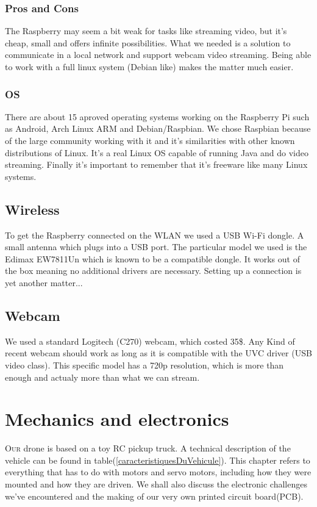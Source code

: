 \documentclass[a4paper,11pt]{report}
\begin{document}
{\begin{enumerate}
\subsection{Pros and Cons}
The Raspberry may seem a bit weak for tasks like streaming video, but it's
cheap, small and offers infinite possibilities. What we needed is a solution
to communicate in a local network and support webcam video streaming. Being
able to work with a full linux system (Debian like) makes the matter much
easier. 

\subsection{OS}
There are about 15 aproved operating systems working on the Raspberry Pi such
as Android, Arch Linux ARM and Debian/Raspbian. We chose Raspbian because of
the large community working with it and it's similarities with other known
distributions of Linux. It's a real Linux OS capable of running Java and do
video streaming. Finally it's important to remember that it's freeware like
many Linux systems.

\section{Wireless}

To get the Raspberry connected on the WLAN we used a USB Wi-Fi dongle. A small
antenna which plugs into a USB port. The particular model we used is the
Edimax EW7811Un which is known to be a compatible dongle. It works out of the
box meaning no additional drivers are necessary. Setting up a connection is
yet another matter...

\section{Webcam}

We used a standard Logitech (C270) webcam, which costed 35\$. Any Kind of
recent webcam should work as long as it is compatible with the UVC driver (USB
video class). This specific model has a 720p resolution, which is more than
enough and actualy more than what we can stream.

\chapter{Mechanics and electronics}


\lettrine{O}{ur} drone is based on a toy RC pickup truck. A technical
description of the vehicle can be found in
table(\ref{caracteristiquesDuVehicule}). This chapter refers to everything
that has to do with motors and servo motors, including how they were mounted
and how they are driven. We shall also discuss the electronic challenges we've
encountered and the making of our very own printed circuit board(PCB). 


\end{enumerate}}
\end{document}

